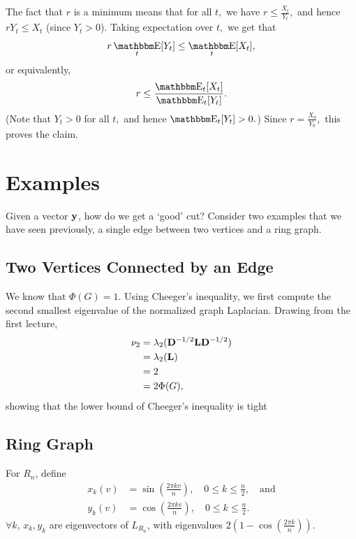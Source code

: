 \documentclass[11pt]{article}
\begin{document}

The fact that $r$ is a minimum means that for all $t,$ we
have $r \le \frac{X_t}{Y_t},$ and hence $ r Y_t \le X_t$ (since $Y_t >
0$). Taking
expectation over $t,$ we get that
\[r \av_t [Y_t] \le \av_t[X_t],\]
or equivalently,
\[r \le \frac{\av_t[X_t]}{\av_t[Y_t]}.\]
(Note that $Y_t > 0$ for all $t,$ and hence $\av_t[Y_t] > 0.$)
Since $r = \frac{X_0}{Y_0},$ this proves the claim.

\section{Examples}
Given a vector $\V{y}$, how do we get a `good' cut? Consider two examples that we have seen previously, a single edge between two vertices and a ring graph.

\subsection{Two Vertices Connected by an Edge}
We know that $\Phi(G)=1$. Using Cheeger's inequality, we first compute the second smallest eigenvalue of the normalized graph Laplacian. Drawing from the first lecture,
\begin{align*}
\nu_2 &= \lambda_2(\V{D}^{-1/2}\V{L}\V{D}^{-1/2})\\
&= \lambda_2(\V{L}) \\
&= 2 \\
&= 2\Phi(G),
\end{align*}
showing that the lower bound of Cheeger's inequality is tight

\subsection{Ring Graph}

\begin{lemma}
For $R_n$, define
\begin{align*}
x_k(v) &= \sin(\frac{2\pi kv}{n}), \quad 0 \leq k \leq \frac{n}{2}, \quad \mathrm{and} \\
y_k(v) &= \cos(\frac{2\pi kv}{n}), \quad 0 \leq k \leq \frac{n}{2}.
\end{align*}
$\forall k$, $x_k, y_k$ are eigenvectors of $L_{R_n}$, with eigenvalues $2(1-\cos(\frac{2\pi k}{n}))$.
\end{lemma}
\end{document}
